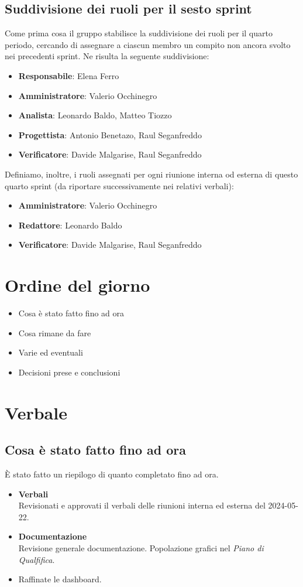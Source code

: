 \documentclass[italian,12pt]{article}
\begin{document}
\subsection{Suddivisione dei ruoli per il sesto sprint}
Come prima cosa il gruppo stabilisce la suddivisione dei ruoli per il quarto periodo, cercando di assegnare a ciascun membro un compito non ancora svolto
nei precedenti sprint. Ne risulta la seguente suddivisione:
\begin{itemize}
	\item \textbf{Responsabile}: Elena Ferro
	\item \textbf{Amministratore}: Valerio Occhinegro
	\item \textbf{Analista}: Leonardo Baldo, Matteo Tiozzo
	\item \textbf{Progettista}: Antonio Benetazo, Raul Seganfreddo
	\item \textbf{Verificatore}: Davide Malgarise, Raul Seganfreddo
\end{itemize}
Definiamo, inoltre, i ruoli assegnati per ogni riunione interna od esterna 
di questo quarto sprint (da riportare successivamente nei relativi verbali):
\begin{itemize}
	\item \textbf{Amministratore}: Valerio Occhinegro
	\item \textbf{Redattore}: Leonardo Baldo
	\item \textbf{Verificatore}: Davide Malgarise, Raul Seganfreddo
\end{itemize}

\section{Ordine del giorno}
\begin{itemize}
	\item Cosa è stato fatto fino ad ora
	\item Cosa rimane da fare
	\item Varie ed eventuali
	\item Decisioni prese e conclusioni
\end{itemize}

\newpage

\section{Verbale}

\subsection{Cosa è stato fatto fino ad ora}
È stato fatto un riepilogo di quanto completato fino ad ora.
\begin{itemize}
	\item \textbf{Verbali} \\
	      Revisionati e approvati il verbali delle riunioni interna ed esterna del 2024-05-22.
	\item \textbf{Documentazione} \\
	      Revisione generale documentazione. Popolazione grafici nel \textit{Piano di Qualfifica}.
	\item Raffinate le dashboard.
\end{itemize}
\end{document}
